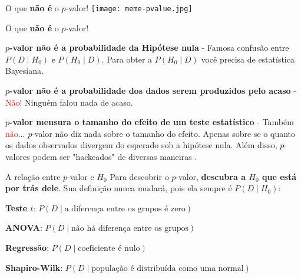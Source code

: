 \begin{frame}{O que \textbf{não é} o $p$-valor!}
    \centering
    \texttt{[image: meme-pvalue.jpg]}
\end{frame}

\begin{frame}{O que \textbf{não é} o $p$-valor!}
    \begin{vfilleditems}
        \item \textbf{$p$-valor não é a probabilidade da Hipótese nula}
        - Famosa confusão entre $P(D \mid H_0)$ e $P(H_0 \mid D)$.
        Para obter a $P(H_0 \mid D)$ você precisa de estatística Bayesiana.
        \item \textbf{$p$-valor não é a probabilidade dos dados serem produzidos pelo acaso}
        - \textcolor{red}{Não!} Ninguém falou nada de acaso.
        \item \textbf{$p$-valor mensura o tamanho do efeito de um teste estatístico}
        - Também \textcolor{red}{não}... $p$-valor não diz nada sobre o tamanho do efeito.
        Apenas sobre se o quanto os dados observados divergem do esperado sob a hipótese nula.
        Além disso, $p$-valores podem ser "hackeados" de diversas maneiras \parencite{head2015extent}.
    \end{vfilleditems}
\end{frame}

\begin{frame}{A relação entre $p$-valor e $H_0$}
    Para descobrir o $p$-valor, \textbf{descubra a $H_0$ que está por trás dele}.
    Sua definição nunca mudará, pois ela sempre é $P(D \mid H_0)$:
    \begin{vfilleditems}
        \item \textbf{Teste $t$}: $P(D \mid \text{a diferença entre os grupos é zero})$
        \item \textbf{ANOVA}: $P(D \mid \text{não há diferença entre os grupos})$
        \item \textbf{Regressão}: $P(D \mid \text{coeficiente é nulo})$
        \item \textbf{Shapiro-Wilk}: $P(D \mid \text{população é distribuída como uma normal})$
    \end{vfilleditems}
\end{frame}

